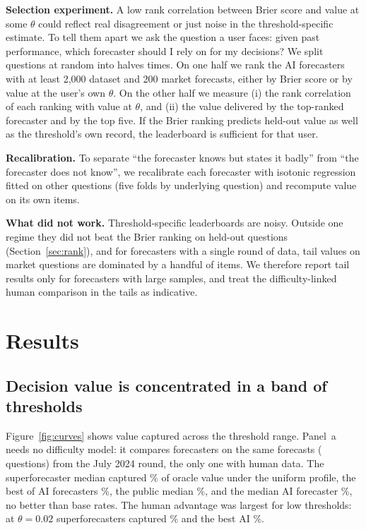 \documentclass[10pt]{article}
\begin{document}
\textbf{Selection experiment.} A low rank correlation between Brier score and value at some $\theta$ could reflect real disagreement or just noise in the threshold-specific estimate. To tell them apart we ask the question a user faces: given past performance, which forecaster should I rely on for my decisions? We split questions at random into halves \nSplits{} times. On one half we rank the \nCand{} AI forecasters with at least 2,000 dataset and 200 market forecasts, either by Brier score or by value at the user's own $\theta$. On the other half we measure (i) the rank correlation of each ranking with value at $\theta$, and (ii) the value delivered by the top-ranked forecaster and by the top five. If the Brier ranking predicts held-out value as well as the threshold's own record, the leaderboard is sufficient for that user.

\textbf{Recalibration.} To separate ``the forecaster knows but states it badly'' from ``the forecaster does not know'', we recalibrate each forecaster with isotonic regression \cite{dimitriadis2021} fitted on other questions (five folds by underlying question) and recompute value on its own items.

\textbf{What did not work.} Threshold-specific leaderboards are noisy. Outside one regime they did not beat the Brier ranking on held-out questions (Section~\ref{sec:rank}), and for forecasters with a single round of data, tail values on market questions are dominated by a handful of items. We therefore report tail results only for forecasters with large samples, and treat the difficulty-linked human comparison in the tails as indicative.

\section{Results}\label{sec:results}
\subsection{Decision value is concentrated in a band of thresholds}
Figure~\ref{fig:curves} shows value captured across the threshold range. Panel~a needs no difficulty model: it compares forecasters on the same \rOneItems{} forecasts (\rOneQuestions{} questions) from the July 2024 round, the only one with human data. The superforecaster median captured \rOneSuperUni\% of oracle value under the uniform profile, the best of \rOneAI{} AI forecasters \rOneBestUni\%, the public median \rOnePublicUni\%, and the median AI forecaster \rOneMedUni\%, no better than base rates. The human advantage was largest for low thresholds: at $\theta=0.02$ superforecasters captured \rOneSuperLow\% and the best AI \rOneBestLow\%.
\end{document}
